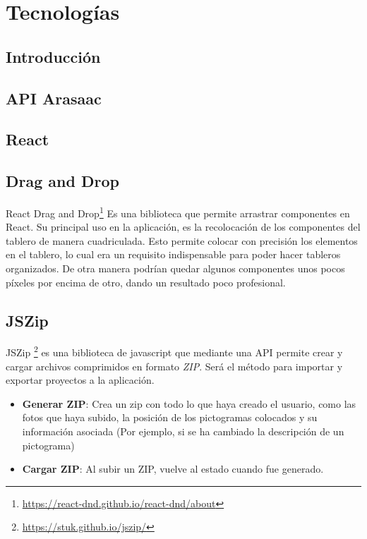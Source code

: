 \chapter{Tecnologías}
\label{cap:introduccion}


\begin{resumen}
	
\end{resumen}

\label{cap1:sec:Motivacion}


\section{Introducción}

\section{API Arasaac}

\section{React}

\section{Drag and Drop}

React Drag and Drop\footnote{\url{https://react-dnd.github.io/react-dnd/about}} Es una biblioteca que permite arrastrar componentes en React. Su principal uso en la aplicación, es la recolocación de los componentes del tablero de manera cuadriculada. Esto permite colocar con precisión los elementos en el tablero, lo cual era un requisito indispensable para poder hacer tableros organizados. De otra manera podrían quedar algunos componentes unos pocos píxeles por encima de otro, dando un resultado poco profesional.

\section{JSZip}

JSZip \footnote{\url{https://stuk.github.io/jszip/}} es una biblioteca de javascript que mediante una API permite crear y cargar archivos comprimidos en formato \textit{ZIP}. Será el método para importar y exportar proyectos a la aplicación.
\begin{itemize}
	\item \textbf{Generar ZIP}: Crea un zip con todo lo que haya creado el usuario, como las fotos que haya subido, la posición de los pictogramas colocados y su información asociada (Por ejemplo, si se ha cambiado la descripción de un pictograma)
	\item \textbf{Cargar ZIP}: Al subir un ZIP, vuelve al estado cuando fue generado.
\end{itemize}	